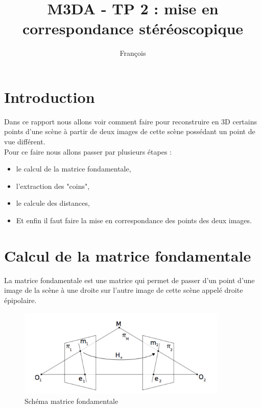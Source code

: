 \documentclass[a4paper,10pt]{article}
\title{M3DA - TP 2 : mise en correspondance st\'er\'eoscopique}
\author{Fran\c cois \bsc{Lepan}}
\begin{document}
\maketitle

\section*{Introduction}

Dans ce rapport nous allons voir comment faire pour reconstruire en 3D certains points d'une sc\`ene \`a partir de deux images de cette sc\`ene poss\'edant un point de vue diff\'erent. \\

Pour ce faire nous allons passer par plusieurs \'etapes :
 
\begin{itemize}
\item le calcul de la matrice fondamentale,
\item l'extraction des "coins",
\item le calcule des distances,
\item Et enfin il faut faire la mise en correspondance des points des deux images.
\end{itemize}

\section{Calcul de la matrice fondamentale}

La matrice fondamentale est une matrice qui permet de passer d'un point d'une image de la sc\`ene \`a une droite sur l'autre image de cette sc\`ene appel\'e droite \'epipolaire. 

\begin{figure}[ht]
\begin{center}
	\includegraphics[width=10cm]{images/matrice_fondamentale.pdf}
\end{center}
	\caption{Sch\'ema matrice fondamentale}
	\label{matrice_fond}
\end{figure}
\end{document}
